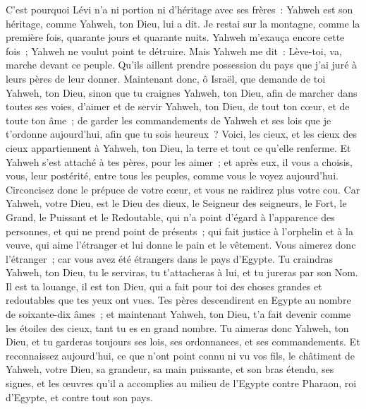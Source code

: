 \begin{multicols}{2}
C'est pourquoi Lévi n'a ni portion ni d'héritage avec ses frères~: Yahweh est son héritage, comme Yahweh, ton Dieu, lui a dit.
Je restai sur la montagne, comme la première fois, quarante jours et quarante nuits. Yahweh m'exauça encore cette fois~; Yahweh ne voulut point te détruire.
Mais Yahweh me dit~: Lève-toi, va, marche devant ce peuple. Qu'ils aillent prendre possession du pays que j'ai juré à leurs pères de leur donner.
Maintenant donc, ô Israël, que demande de toi Yahweh, ton Dieu, sinon que tu craignes Yahweh, ton Dieu, afin de marcher dans toutes ses voies, d'aimer et de servir Yahweh, ton Dieu, de tout ton cœur, et de toute ton âme~;
de garder les commandements de Yahweh et ses lois que je t'ordonne aujourd'hui, afin que tu sois heureux~?
Voici, les cieux, et les cieux des cieux appartiennent à Yahweh, ton Dieu, la terre et tout ce qu'elle renferme.
Et Yahweh s'est attaché à tes pères, pour les aimer~; et après eux, il vous a choisis, vous, leur postérité, entre tous les peuples, comme vous le voyez aujourd'hui.
Circoncisez donc le prépuce de votre cœur, et vous ne raidirez plus votre cou.
Car Yahweh, votre Dieu, est le Dieu des dieux, le Seigneur des seigneurs, le Fort, le Grand, le Puissant et le Redoutable, qui n'a point d'égard à l'apparence des personnes, et qui ne prend point de présents~;
qui fait justice à l'orphelin et à la veuve, qui aime l'étranger et lui donne le pain et le vêtement.
Vous aimerez donc l'étranger~; car vous avez été étrangers dans le pays d'Egypte.
Tu craindras Yahweh, ton Dieu, tu le serviras, tu t'attacheras à lui, et tu jureras par son Nom.
Il est ta louange, il est ton Dieu, qui a fait pour toi des choses grandes et redoutables que tes yeux ont vues.
Tes pères descendirent en Egypte au nombre de soixante-dix âmes~; et maintenant Yahweh, ton Dieu, t'a fait devenir comme les étoiles des cieux, tant tu es en grand nombre.
\VerseOne{}Tu aimeras donc Yahweh, ton Dieu, et tu garderas toujours ses lois, ses ordonnances, et ses commandements.
Et reconnaissez aujourd'hui, ce que n'ont point connu ni vu vos fils, le châtiment de Yahweh, votre Dieu, sa grandeur, sa main puissante, et son bras étendu,
ses signes, et les œuvres qu'il a accomplies au milieu de l'Egypte contre Pharaon, roi d'Egypte, et contre tout son pays.

\end{multicols}
